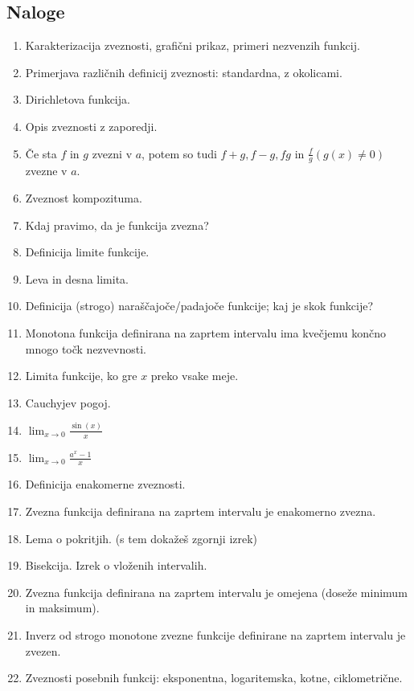 \documentclass[a4paper,12pt]{report}
\begin{document}
\subsection*{Naloge}

\begin{enumerate}
    \item Karakterizacija zveznosti, grafični prikaz, primeri nezvenzih funkcij.
    \item Primerjava različnih definicij zveznosti: standardna, z okolicami.
    \item Dirichletova funkcija.
    \item Opis zveznosti z zaporedji.
    \item Če sta $f$ in $g$ zvezni v $a$, potem so tudi $f+g, f-g, fg $ in $\frac{f}{g} (g(x) \neq 0)$ zvezne v $a$.
    \item Zveznost kompozituma.
    \item Kdaj pravimo, da je funkcija zvezna?
    \item Definicija limite funkcije.
    \item Leva in desna limita.
    \item Definicija (strogo) naraščajoče/padajoče funkcije; kaj je skok funkcije?
    \item Monotona funkcija definirana na zaprtem intervalu ima kvečjemu končno mnogo točk nezvevnosti.
    \item Limita funkcije, ko gre $x$ preko vsake meje.
    \item Cauchyjev pogoj.
    \item $\lim_{x \to 0} \frac{\sin(x)}{x}$
    \item $\lim_{x \to 0} \frac{a^x - 1}{x}$
    \item Definicija enakomerne zveznosti.
    \item Zvezna funkcija definirana na zaprtem intervalu je enakomerno zvezna.
    \item Lema o pokritjih. (s tem dokažeš zgornji izrek)
    \item Bisekcija. Izrek o vloženih intervalih.
    \item Zvezna funkcija definirana na zaprtem intervalu je omejena (doseže minimum in maksimum).
    \item Inverz od strogo monotone zvezne funkcije definirane na zaprtem intervalu je zvezen.
    \item Zveznosti posebnih funkcij: eksponentna, logaritemska, kotne, ciklometrične.
\end{enumerate}
\end{document}
